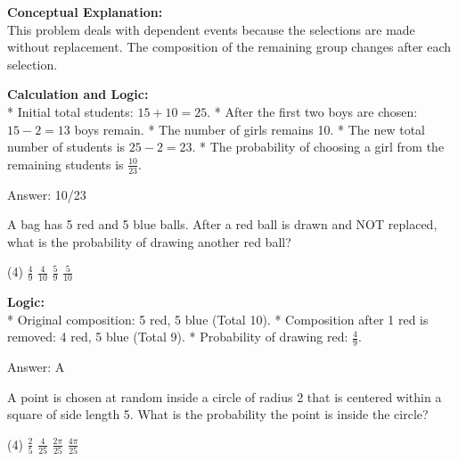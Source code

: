 \documentclass[11pt,paper=a4,answers]{exam}
\begin{document}
\begin{questions}
\begin{solution}
\textbf{Conceptual Explanation:} \\
This problem deals with dependent events because the selections are made without replacement. The composition of the remaining group changes after each selection.

\vspace{30pt}

\textbf{Calculation and Logic:} \\
* Initial total students: $15 + 10 = 25$.
* After the first two boys are chosen: $15 - 2 = 13$ boys remain.
* The number of girls remains 10.
* The new total number of students is $25 - 2 = 23$.
* The probability of choosing a girl from the remaining students is $\frac{10}{23}$.

\vspace{30pt}

Answer: \colorbox{yellow!100}{10/23}
\end{solution}

\vspace{60pt}

\question
A bag has 5 red and 5 blue balls. After a red ball is drawn and NOT replaced, what is the probability of drawing another red ball?
\begin{tasks}(4)
    \task $\frac{4}{9}$
    \task $\frac{4}{10}$
    \task $\frac{5}{9}$
    \task $\frac{5}{10}$
\end{tasks}

\begin{solution}
\textbf{Logic:} \\
* Original composition: 5 red, 5 blue (Total 10).
* Composition after 1 red is removed: 4 red, 5 blue (Total 9).
* Probability of drawing red: $\frac{4}{9}$.

\vspace{30pt}

Answer: \colorbox{yellow!100}{A}
\end{solution}

\vspace{60pt}

\question
A point is chosen at random inside a circle of radius 2 that is centered within a square of side length 5. What is the probability the point is inside the circle?
\begin{tasks}(4)
    \task $\frac{2}{5}$
    \task $\frac{4}{25}$
    \task $\frac{2\pi}{25}$
    \task $\frac{4\pi}{25}$
\end{tasks}


\end{questions}
\end{document}
